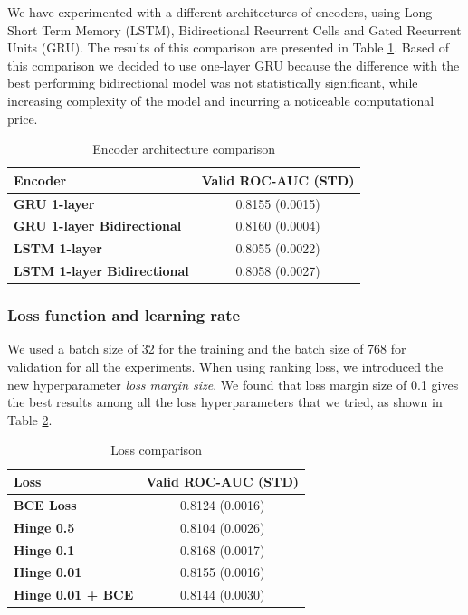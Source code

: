 \documentclass[sigconf]{acmart}
\begin{document}
We have experimented with a different architectures of encoders, using Long Short Term Memory (LSTM), Bidirectional Recurrent Cells \cite{schuster1997bidirectional} and Gated Recurrent Units (GRU). The results of this comparison are presented in Table \ref{tab-enc-arch}. Based of this comparison we decided to use one-layer GRU because the difference with the best performing bidirectional model was not statistically significant, while increasing complexity of the model and incurring a noticeable computational price.

\begin{table}[ht]
\caption{Encoder architecture comparison}
\begin{tabular}{ | l | c |  }
\hline
\textbf{Encoder} & \textbf{Valid ROC-AUC (STD)} \\
\hline
\textbf{GRU 1-layer} & 0.8155 (0.0015)  \\
\textbf{GRU 1-layer Bidirectional} & 0.8160 (0.0004)  \\
\textbf{LSTM 1-layer} & 0.8055 (0.0022) \\
\textbf{LSTM 1-layer Bidirectional} & 0.8058 (0.0027)  \\

\hline
\end{tabular}
\label{tab-enc-arch}
\end{table}


\subsubsection{Loss function and learning rate}

We used a batch size of 32 for the training and the batch size of 768 for validation for all the experiments. When using ranking loss, we introduced the new hyperparameter \textit{loss margin size}. We found that loss margin size of 0.1 gives the best results among all the loss hyperparameters that we tried, as shown in Table \ref{tab-loss}.

\begin{table}[ht]
\caption{Loss comparison}
\begin{tabular}{ | l | c |  }
\hline
\textbf{Loss} & \textbf{Valid ROC-AUC (STD)} \\
\hline
\textbf{BCE Loss} & 0.8124 (0.0016)  \\
\textbf{Hinge 0.5} & 0.8104 (0.0026)  \\
\textbf{Hinge 0.1} & 0.8168 (0.0017)  \\
\textbf{Hinge 0.01} & 0.8155 (0.0016)  \\
\textbf{Hinge 0.01 + BCE} & 0.8144 (0.0030)  \\
\hline
\end{tabular}
\label{tab-loss}
\end{table}
\end{document}
